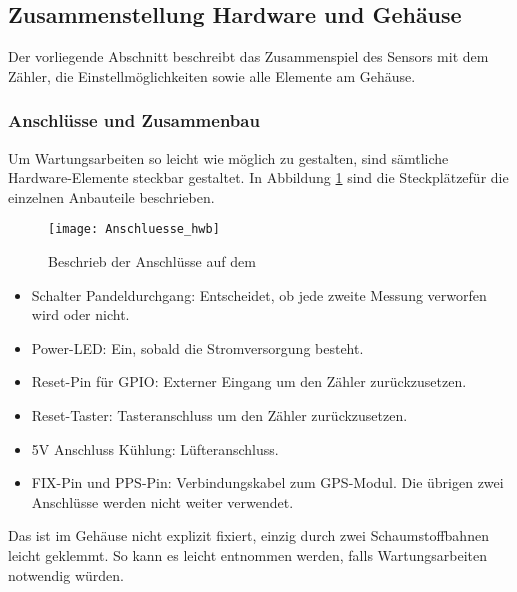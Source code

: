 \subsection{Zusammenstellung Hardware und Gehäuse}
\label{cap:housing}
Der vorliegende Abschnitt beschreibt das Zusammenspiel des Sensors mit dem Zähler, die Einstellmöglichkeiten sowie alle Elemente am Gehäuse.
\subsubsection{Anschlüsse und Zusammenbau}
Um Wartungsarbeiten so leicht wie möglich zu gestalten, sind sämtliche Hardware-Elemente steckbar gestaltet. In Abbildung \ref{fig:Anschluesse_hwb} sind die Steckplätzefür die einzelnen Anbauteile beschrieben.
\begin{figure}[H]
	\centering
	\texttt{[image: Anschluesse\_hwb]}
	\caption{Beschrieb der Anschlüsse auf dem \hwb}
	\label{fig:Anschluesse_hwb}
\end{figure}
\begin{itemize}
	\item Schalter Pandeldurchgang: Entscheidet, ob jede zweite Messung verworfen wird oder nicht.
	\item Power-LED: Ein, sobald die Stromversorgung besteht.
	\item Reset-Pin für GPIO: Externer Eingang um den Zähler zurückzusetzen.
	\item Reset-Taster: Tasteranschluss um den Zähler zurückzusetzen.
	\item 5V Anschluss Kühlung: Lüfteranschluss.
	\item FIX-Pin und PPS-Pin: Verbindungskabel zum GPS-Modul. Die übrigen zwei Anschlüsse werden nicht weiter verwendet.
\end{itemize}
Das \hwb ist im Gehäuse nicht explizit fixiert, einzig durch zwei Schaumstoffbahnen leicht geklemmt. So kann es leicht entnommen werden, falls Wartungsarbeiten notwendig würden.
